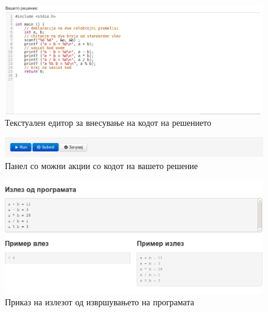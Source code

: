 \begin{figure}[htbp]
\centering
\includegraphics[scale=.4]{images/code/editor}
\caption{Текстуален едитор за внесување на кодот на решението}
\label{fig:editor}
\end{figure}

\begin{figure}[htbp]
\centering
\includegraphics[scale=.4]{images/code/actions}
\caption{Панел со можни акции со кодот на вашето решение}
\label{fig:actions}
\end{figure}

\begin{figure}[htbp]
\centering
\includegraphics[scale=.5]{images/code/output}
\caption{Приказ на излезот од извршувањето на програмата}
\label{fig:output}
\end{figure}

